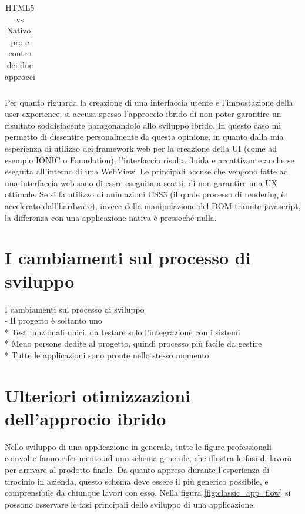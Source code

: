 \begin{table}[h]
\begin{tabular}{|p{7.5cm}p{7.5cm}|}
	\end{tabular}
	\caption{HTML5 vs Nativo, pro e contro dei due approcci}
	\label{tbl:html5_vs_native}
\end{table}

Per quanto riguarda la creazione di una interfaccia utente e l'impostazione della user experience, si accusa spesso l'approccio ibrido di non poter garantire un risultato soddisfacente paragonandolo allo sviluppo ibrido. In questo caso mi permetto di dissentire personalmente da questa opinione, in quanto dalla mia esperienza di utilizzo dei framework web per la creazione della UI (come ad esempio IONIC o Foundation), l'interfaccia risulta fluida e accattivante anche se eseguita all'interno di una WebView. Le principali accuse che vengono fatte ad una interfaccia web sono di essre eseguita a scatti, di non garantire una UX ottimale. Se si fa utilizzo di animazioni CSS3 (il quale processo di rendering è accelerato dall'hardware), invece della manipolazione del DOM tramite javascript, la differenza con una applicazione nativa è pressoché nulla.

\section{I cambiamenti sul processo di sviluppo}
I cambiamenti sul processo di sviluppo\\

 - Il progetto è soltanto uno\\
 * Test funzionali unici, da testare solo l'integrazione con i sistemi\\
 * Meno persone dedite al progetto, quindi processo più facile da gestire\\
 * Tutte le applicazioni sono pronte nello stesso momento\\
\section{Ulteriori otimizzazioni dell'approcio ibrido}
Nello sviluppo di una applicazione in generale, tutte le figure professionali coinvolte fanno riferimento ad uno schema generale, che illustra le fasi di lavoro per arrivare al prodotto finale. Da quanto appreso durante l'esperienza di tirocinio in azienda, questo schema deve essere il più generico possibile, e comprensibile da chiunque lavori con esso. Nella figura \ref{fig:classic_app_flow} si possono osservare le fasi principali dello sviluppo di una applicazione.

